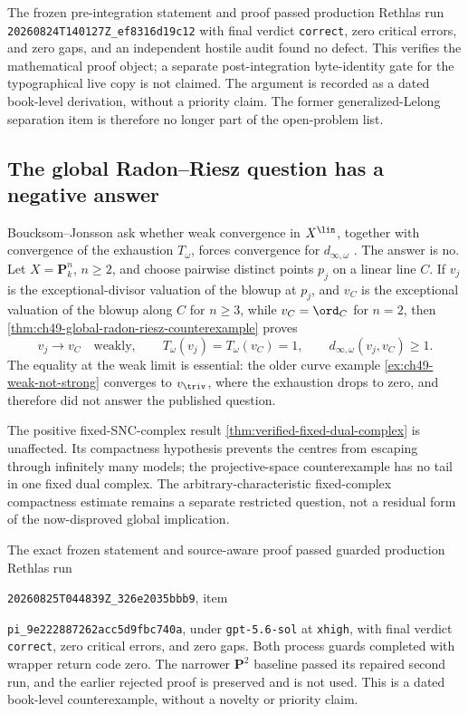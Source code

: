 The frozen pre-integration statement and proof passed production Rethlas run
\nolinkurl{20260824T140127Z_ef8316d19c12} with final verdict
\texttt{correct}, zero critical errors, and zero gaps, and an independent
hostile audit found no defect.  This verifies the mathematical proof object;
a separate post-integration byte-identity gate for the typographical live
copy is not claimed.  The argument is recorded as a dated book-level
derivation, without a priority claim.  The former generalized-Lelong
separation item is therefore no longer part of the open-problem list.

\subsection{The global Radon--Riesz question has a negative answer}
\label{sec:resolved-bj-radon-riesz}

Boucksom--Jonsson ask whether weak convergence in \(X^{\lin}\), together
with convergence of the exhaustion \(T_\omega\), forces convergence for
\(d_{\infty,\omega}\) \cite[Question~11.16]{BJ22}.  The answer is no.  Let
\(X=\mathbf P^n_k\), \(n\ge2\), and choose pairwise distinct points
\(p_j\) on a linear line \(C\).  If \(v_j\) is the exceptional-divisor
valuation of the blowup at \(p_j\), and \(v_C\) is the exceptional valuation
of the blowup along \(C\) for \(n\ge3\), while \(v_C=\ord_C\) for \(n=2\),
then \cref{thm:ch49-global-radon-riesz-counterexample} proves
\[
 v_j\longrightarrow v_C\quad\text{weakly},\qquad
 T_\omega(v_j)=T_\omega(v_C)=1,
 \qquad
 d_{\infty,\omega}(v_j,v_C)\ge1.
\]
The equality at the weak limit is essential: the older curve example
\cref{ex:ch49-weak-not-strong} converges to \(v_{\triv}\), where the
exhaustion drops to zero, and therefore did not answer the published
question.

The positive fixed-SNC-complex result
\cref{thm:verified-fixed-dual-complex} is unaffected.  Its compactness
hypothesis prevents the centres from escaping through infinitely many
models; the projective-space counterexample has no tail in one fixed dual
complex.  The arbitrary-characteristic fixed-complex compactness estimate
remains a separate restricted question, not a residual form of the
now-disproved global implication.

The exact frozen statement and source-aware proof passed guarded production
Rethlas run
\par\nolinkurl{20260825T044839Z_326e2035bbb9}, item
\par\nolinkurl{pi_9e222887262acc5d9fbc740a}, under \texttt{gpt-5.6-sol} at
\texttt{xhigh}, with final verdict \texttt{correct}, zero critical errors,
and zero gaps.  Both process guards completed with wrapper return code zero.
The narrower \(\mathbf P^2\) baseline passed its repaired second run, and
the earlier rejected proof is preserved and is not used.  This is a dated
book-level counterexample, without a novelty or priority claim.

